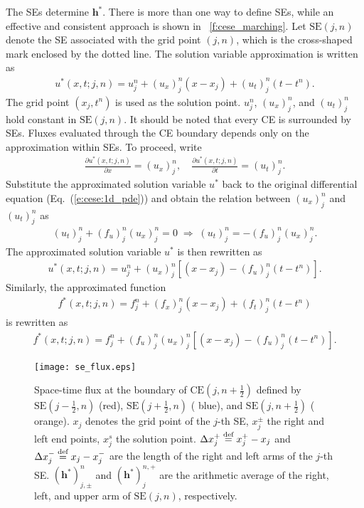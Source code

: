 \documentclass{turgon}
\begin{document}
The SEs determine $\mathbf{h}^*$.  There is more than one way to define SEs,
while an effective and consistent approach is shown in
\figurename~\ref{f:cese_marching}.  Let $\mathrm{SE}(j,n)$ denote the SE
associated with the grid point $(j,n)$, which is the cross-shaped mark enclosed
by the dotted line.  The solution variable approximation is written as
\begin{align*}
  u^*(x,t;j,n) = u_j^n + (u_x)_j^n(x-x_j) + (u_t)_j^n(t-t^n) .
\end{align*}
The grid point $(x_j, t^n)$ is used as the solution point.  $u_j^n$,
$(u_x)_j^n$, and $(u_t)_j^n$ hold constant in $\mathrm{SE}(j,n)$.  It should be
noted that every CE is surrounded by SEs.  Fluxes evaluated through the CE
boundary depends only on the approximation within SEs.  To proceed, write
\begin{align*}
  \frac{\partial u^*(x,t;j,n)}{\partial x} = (u_x)_j^n, \quad
  \frac{\partial u^*(x,t;j,n)}{\partial t} = (u_t)_j^n .
\end{align*}
Substitute the approximated solution variable $u^*$ back to the original
differential equation (Eq.~(\ref{e:cese:1d_pde})) and obtain the relation
between $(u_x)_j^n$ and $(u_t)_j^n$ as
\begin{align*}
                  (u_t)_j^n + (f_u)_j^n(u_x)_j^n = 0
  \;\Rightarrow\; (u_t)_j^n = -(f_u)_j^n(u_x)_j^n .
\end{align*}
The approximated solution variable $u^*$ is then rewritten as
\begin{align*}
  u^*(x,t;j,n) = u_j^n + (u_x)_j^n\left[(x-x_j) - (f_u)_j^n(t-t^n)\right] .
\end{align*}
Similarly, the approximated function
\begin{align*}
  f^*(x,t;j,n) = f_j^n + (f_x)_j^n(x-x_j) + (f_t)_j^n(t-t^n)
\end{align*}
is rewritten as
\begin{align*}
  f^*(x,t;j,n) = f_j^n + (f_u)_j^n (u_x)_j^n \left[
    (x-x_j) - (f_u)_j^n(t-t^n)
  \right] .
\end{align*}

\begin{figure}[hbtp]
  \centering
  \texttt{[image: se\_flux.eps]}
  \caption{Space-time flux at the boundary of $\mathrm{CE}(j, n+\frac{1}{2})$
  defined by $\mathrm{SE}(j-\frac{1}{2}, n)$ ({\color{red}red}),
  $\mathrm{SE}(j+\frac{1}{2}, n)$ ({\color{blue} blue}), and $\mathrm{SE}(j,
  n+\frac{1}{2})$ ({\color{orange} orange}).  $x_j$ denotes the grid point of
  the $j$-th SE, $x_j^{\pm}$ the right and left end points, $x_j^s$ the
  solution point.  $\Delta x_j^+ \defeq x_j^+ - x_j$ and $\Delta x_j^- \defeq
  x_j - x_j^-$ are the length of the right and left arms of the $j$-th SE.
  $(\mathbf{h^*})_{j,\pm}^n$ and $(\mathbf{h^*})_{j}^{n,+}$ are the arithmetic
  average of the right, left, and upper arm of $\mathrm{SE}(j,n)$,
  respectively.}
  \label{f:se_flux}
\end{figure}
\end{document}
